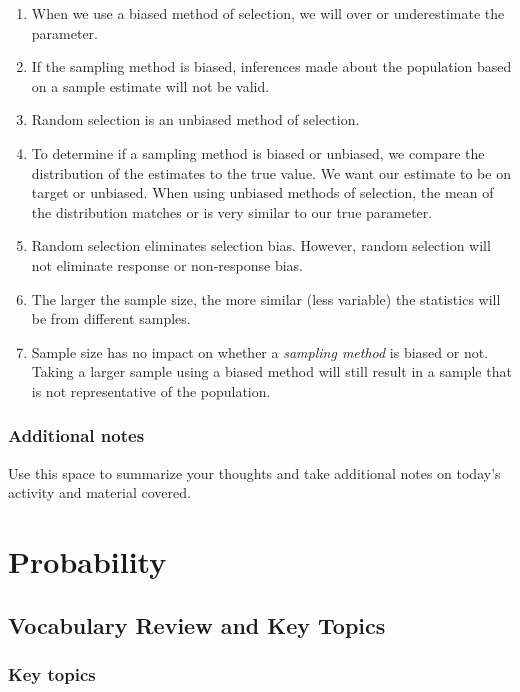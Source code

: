 \documentclass[
]{report}
\begin{document}
\begin{enumerate}
\def\labelenumi{\arabic{enumi}.}
\item
  When we use a biased method of selection, we will over or underestimate the parameter.
\item
  If the sampling method is biased, inferences made about the population based on a sample estimate will not be valid.
\item
  Random selection is an unbiased method of selection.
\item
  To determine if a sampling method is biased or unbiased, we compare the distribution of the estimates to the true value. We want our estimate to be on target or unbiased. When using unbiased methods of selection, the mean of the distribution matches or is very similar to our true parameter.
\item
  Random selection eliminates selection bias. However, random selection will not eliminate response or non-response bias.
\item
  The larger the sample size, the more similar (less variable) the statistics will be from different samples.
\item
  Sample size has no impact on whether a \emph{sampling method} is biased or not. Taking a larger sample using a biased method will still result in a sample that is not representative of the population.
\end{enumerate}

\subsection{Additional notes}\label{additional-notes-2}

Use this space to summarize your thoughts and take additional notes on today's activity and material covered.

\newpage

\chapter{Probability}\label{probability}

\section{Vocabulary Review and Key Topics}\label{vocabulary-review-and-key-topics-1}

\subsection{Key topics}\label{key-topics-1}
\end{document}
